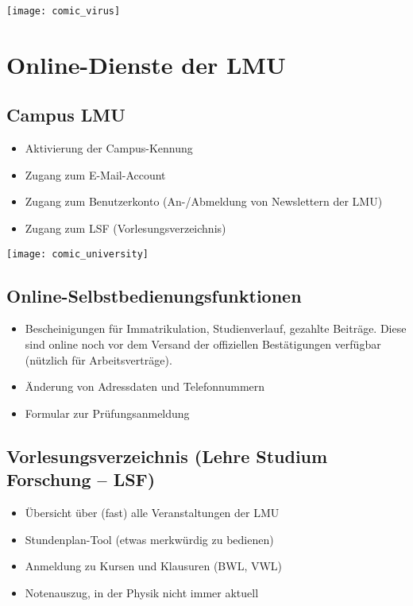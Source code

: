 \begin{center}
	{\texttt{[image: comic\_virus]}}
\end{center}

\section{Online-Dienste der LMU}
\label{sec:online}
\subsection*{Campus LMU}
\begin{itemize}
	\item Aktivierung der Campus-Kennung
	\item Zugang zum E-Mail-Account
	\item Zugang zum Benutzerkonto (An-/Abmeldung von Newslettern der LMU)
	\item Zugang zum LSF (Vorlesungsverzeichnis)
\end{itemize}
\begin{urlList}
\end{urlList}

\begin{center}
	{\texttt{[image: comic\_university]}}
\end{center}

\subsection*{Online-Selbstbedienungsfunktionen}
\begin{itemize}
	\item Bescheinigungen für Immatrikulation, Studienverlauf, gezahlte Beiträge. Diese sind online noch vor dem Versand der offiziellen Bestätigungen verfügbar (nützlich für Arbeitsverträge).
	\item Änderung von Adressdaten und Telefonnummern
	\item Formular zur Prüfungsanmeldung
\end{itemize}
\begin{urlList}
\end{urlList}

\subsection*{Vorlesungsverzeichnis (Lehre Studium Forschung -- LSF)}
\begin{itemize}
	\item Übersicht über (fast) alle Veranstaltungen der LMU
	\item Stundenplan-Tool (etwas merkwürdig zu bedienen)
	\item Anmeldung zu Kursen und Klausuren (BWL, VWL)
	\item Notenauszug, in der Physik nicht immer aktuell
\end{itemize}
\begin{urlList}
\end{urlList}


